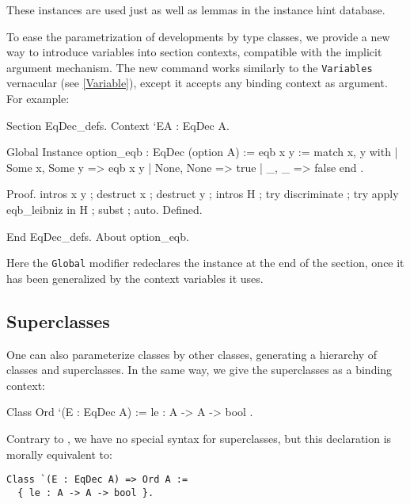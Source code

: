 These instances are used just as well as lemmas in the instance hint database.

\label{SectionContext}
To ease the parametrization of developments by type classes, we provide
a new way to introduce variables into section contexts, compatible with 
the implicit argument mechanism. 
The new command works similarly to the \texttt{Variables} vernacular
(see \ref{Variable}), except it accepts any binding context as argument.
For example:

\begin{coq_example}
Section EqDec_defs.
  Context `{EA : EqDec A}.
\end{coq_example}

\begin{coq_example*}
  Global Instance option_eqb : EqDec (option A) :=
  { eqb x y := match x, y with
    | Some x, Some y => eqb x y
    | None, None => true
    | _, _ => false
    end }.
\end{coq_example*}
\begin{coq_eval}
Proof.
intros x y ; destruct x ; destruct y ; intros H ; 
try discriminate ; try apply eqb_leibniz in H ;
subst ; auto. 
Defined.
\end{coq_eval}

\begin{coq_example}
End EqDec_defs.
About option_eqb.
\end{coq_example}

Here the \texttt{Global} modifier redeclares the instance at the end of 
the section, once it has been generalized by the context variables it uses.


\subsection{Superclasses}
\label{classes:superclasses}
One can also parameterize classes by other classes, generating a
hierarchy of classes and superclasses. In the same way, we give the
superclasses as a binding context:

\begin{coq_example*}
Class Ord `(E : EqDec A) :=
  { le : A -> A -> bool }.
\end{coq_example*}

Contrary to \Haskell, we have no special syntax for superclasses, but
this declaration is morally equivalent to:
\begin{verbatim}
Class `(E : EqDec A) => Ord A :=
  { le : A -> A -> bool }.
\end{verbatim}

